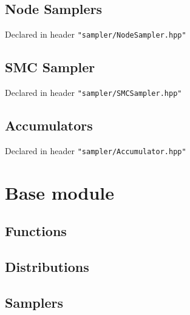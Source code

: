 \subsection{Node Samplers}
Declared in header \texttt{"sampler/NodeSampler.hpp"}

\subsection{SMC Sampler}
Declared in header \texttt{"sampler/SMCSampler.hpp"}

\subsection{Accumulators}
Declared in header \texttt{"sampler/Accumulator.hpp"}


\section{\biips Base module}

\subsection{Functions}

\subsection{Distributions}

\subsection{Samplers}